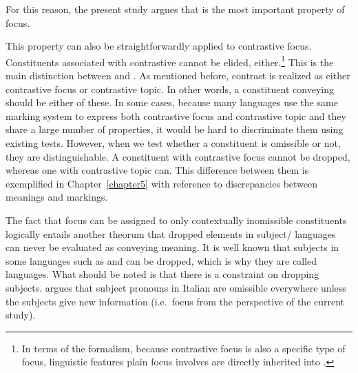 \noindent For this reason, the present study argues that
 is the most important property of focus.



This property can also be straightforwardly applied to contrastive
focus. Constituents associated with contrastive  cannot be
elided, either.\footnote{In terms of the  formalism, because
  contrastive focus is also a specific type of focus, linguistic
  features plain focus involves are directly inherited into
  .} This is the main distinction between
 and . As mentioned
before, contrast is realized as either contrastive focus or
contrastive topic. In other words, a constituent conveying
 should be either of these. In some cases,
because many languages use the same marking system to express both
contrastive focus and contrastive topic and they share a large number
of properties, it would be hard to discriminate them using existing
tests. However, when we test whether a constituent is omissible or
not, they are distinguishable. A constituent with contrastive focus
cannot be dropped, whereas one with contrastive topic can. This
difference between them is exemplified in
Chapter~\ref{chapter5}  with reference to
discrepancies between meanings and markings.



The fact that focus can be assigned to only contextually inomissible
constituents logically entails another theorum that dropped elements
in subject/ languages can never be evaluated as
conveying  meaning.  
It is well known that subjects in some languages such as 
 and  can be dropped, 
which is why they are called  languages.
What should be noted is that there is a constraint on
dropping subjects. \citet[406]{cinque:77} argues that subject
pronouns in Italian are omissible everywhere unless the subjects give
new information (i.e.\ focus from the perspective of the current
study).



